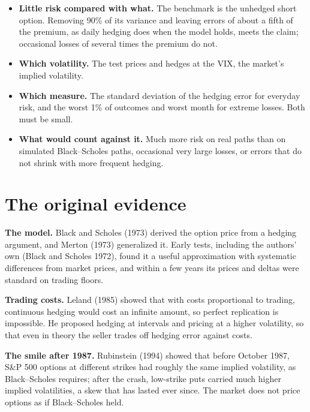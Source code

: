 \begin{itemize}
  \item \textbf{Little risk compared with what.} The benchmark is the unhedged short option. Removing 90\% of its variance and leaving errors of about a fifth of the premium, as daily hedging does when the model holds, meets the claim; occasional losses of several times the premium do not.
  \item \textbf{Which volatility.} The test prices and hedges at the VIX, the market's implied volatility.
  \item \textbf{Which measure.} The standard deviation of the hedging error for everyday risk, and the worst 1\% of outcomes and worst month for extreme losses. Both must be small.
  \item \textbf{What would count against it.} Much more risk on real paths than on simulated Black--Scholes paths, occasional very large losses, or errors that do not shrink with more frequent hedging.
\end{itemize}

\section{The original evidence}
\label{sec:14-evidence}

\textbf{The model.} Black and Scholes (1973) derived the option price from a hedging argument, and Merton (1973) generalized it. Early tests, including the authors' own (Black and Scholes 1972), found it a useful approximation with systematic differences from market prices, and within a few years its prices and deltas were standard on trading floors.

\textbf{Trading costs.} Leland (1985) showed that with costs proportional to trading, continuous hedging would cost an infinite amount, so perfect replication is impossible. He proposed hedging at intervals and pricing at a higher volatility, so that even in theory the seller trades off hedging error against costs.

\textbf{The smile after 1987.} Rubinstein (1994) showed that before October 1987, S\&P 500 options at different strikes had roughly the same implied volatility, as Black--Scholes requires; after the crash, low-strike puts carried much higher implied volatilities, a skew that has lasted ever since. The market does not price options as if Black--Scholes held.

